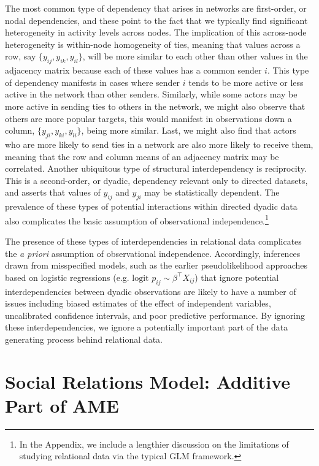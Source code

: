 \documentclass[12pt,pdflatex]{elsarticle}
\begin{document}
The most common type of dependency that arises in networks are first-order, or nodal dependencies, and these point to the fact that we typically find significant heterogeneity in activity levels across nodes. The implication of this across-node heterogeneity is within-node homogeneity of ties, meaning that values across a row, say $\{y_{ij},y_{ik},y_{il}\}$, will be more similar to each other than other values in the adjacency matrix because each of these values has a common sender $i$. This type of dependency manifests in cases where sender $i$ tends to be more active or less active in the network than other senders. Similarly, while some actors may be more active in sending ties to others in the network, we might also observe that others are more popular targets, this would manifest in observations down a column, $\{y_{ji},y_{ki},y_{li}\}$, being more similar. Last, we might also find that actors who are more likely to send ties in a network are also more likely to receive them, meaning that the row and column means of an adjacency matrix may be correlated. Another ubiquitous type of structural interdependency is reciprocity. This is a second-order, or dyadic, dependency relevant only to directed datasets, and asserts that values of $y_{ij}$ and $y_{ji}$ may be statistically dependent. The prevalence of these types of potential interactions within directed dyadic data also complicates the basic assumption of observational independence.\footnote{In the Appendix, we include a lengthier discussion on the limitations of studying relational data via the typical GLM framework.}

The presence of these types of interdependencies in relational data complicates the \textit{a priori} assumption of observational independence.  Accordingly, inferences drawn from misspecified models, such as the earlier pseudolikelihood approaches based on logistic regressions (e.g. $\text{logit } p_{ij} \sim \beta^\intercal X_{ij}$) that ignore potential interdependencies between dyadic observations are likely to have a number of issues including biased estimates of the effect of independent variables, uncalibrated confidence intervals, and poor predictive performance. By ignoring these interdependencies, we ignore a potentially important part of the data generating process behind relational data. 

\section*{\textbf{Social Relations Model: Additive Part of AME}}
\end{document}
